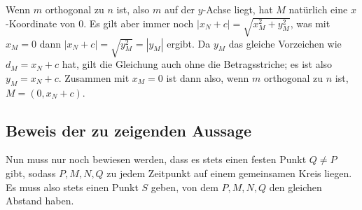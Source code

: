 Wenn $m$ orthogonal zu $n$ ist, also $m$ auf der $y$-Achse liegt, hat $M$ natürlich eine $x$-Koordinate von 0. 
Es gilt aber immer noch $|x_N+c|=\sqrt{x_M^2+y_M^2}$, was mit $x_M=0$ dann $|x_N+c|=\sqrt{y_M^2}=|y_M|$ ergibt. Da 
$y_M$ das gleiche Vorzeichen wie $d_M=x_N+c$ hat, gilt die Gleichung auch ohne die Betragsstriche; es ist also $y_M
=x_N+c$. Zusammen mit $x_M=0$ ist dann also, wenn $m$ orthogonal zu $n$ ist, $M=(0, x_N+c)$.

\subsection*{Beweis der zu zeigenden Aussage}

Nun muss nur noch bewiesen werden, dass es stets einen festen Punkt $Q\neq P$ gibt, sodass $P, M, N, Q$ zu jedem 
Zeitpunkt auf einem gemeinsamen Kreis liegen. Es muss also stets einen Punkt $S$ geben, von dem $P, M, N, Q$ den 
gleichen Abstand haben.

